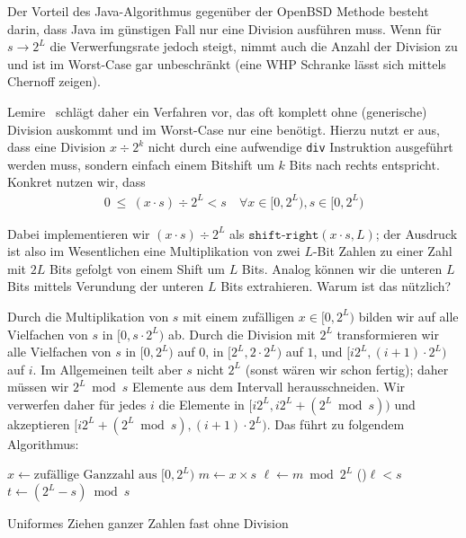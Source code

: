 Der Vorteil des Java-Algorithmus gegenüber der OpenBSD Methode besteht darin, dass Java im günstigen Fall nur eine Division ausführen muss.
Wenn für $s \to 2^L$ die Verwerfungsrate jedoch steigt, nimmt auch die Anzahl der Division zu und ist im Worst-Case gar unbeschränkt (eine WHP Schranke lässt sich mittels Chernoff zeigen).

Lemire~\cite{DBLP:journals/tomacs/Lemire19} schlägt daher ein Verfahren vor, das oft komplett ohne (generische) Division auskommt und im Worst-Case nur eine benötigt.
Hierzu nutzt er aus, dass eine Division $x \div 2^k$ nicht durch eine aufwendige \texttt{div} Instruktion ausgeführt werden muss, sondern einfach einem Bitshift um $k$ Bits nach rechts entspricht.
Konkret nutzen wir, dass
\begin{align}
    0 \ \le \ (x \cdot s) \div 2^L  <  s
    \quad \forall x \in [0, 2^L), s \in [0, 2^L)
\end{align}

Dabei implementieren wir $(x \cdot s) \div 2^L$ als $\texttt{shift-right}(x \cdot s, L)$;
der Ausdruck ist also im Wesentlichen eine Multiplikation von zwei $L$-Bit Zahlen zu einer Zahl mit $2L$ Bits gefolgt von einem Shift um $L$ Bits.
Analog können wir die unteren $L$ Bits mittels Verundung der unteren $L$ Bits extrahieren.
Warum ist das nützlich?

Durch die Multiplikation von $s$ mit einem zufälligen $x \in [0, 2^L)$ bilden wir auf alle Vielfachen von $s$ in $[0, s\cdot 2^L)$ ab.
Durch die Division mit $2^L$ transformieren wir alle Vielfachen von $s$ in $[0, 2^L)$ auf $0$, in $[2^L, 2\cdot2^L)$ auf $1$, und $[i 2^L, (i+1)\cdot2^L)$ auf $i$.
Im Allgemeinen teilt aber $s$ nicht $2^L$ (sonst wären wir schon fertig);
daher müssen wir $2^L \bmod s$ Elemente aus dem Intervall herausschneiden.
Wir verwerfen daher für jedes $i$ die Elemente in $[i 2^L, i 2^L + (2^L \bmod s))$ und akzeptieren $[ i 2^L + (2^L \bmod s), (i+1)\cdot2^L)$.
Das führt zu folgendem Algorithmus:

\begin{algorithm}[H]
    $x \gets \text{zufällige Ganzzahl aus $[0, 2^L)$}$\;
    $m \gets x \times s$\;
    $\ell \gets m \bmod 2^L$\;
    \If(){$\ell < s$}{
    $t \gets (2^L -s) \bmod s$
    \While{$\ell < t$}{
    $x \gets \text{zufällige Ganzzahl aus $[0, 2^L)$}$\;
    $m \gets x \times s$\;
    $\ell \gets m \bmod 2^L$\;
    }
    }
    \caption{Uniformes Ziehen ganzer Zahlen fast ohne Division}
    \label{algo:uniform_lemire}
\end{algorithm}

